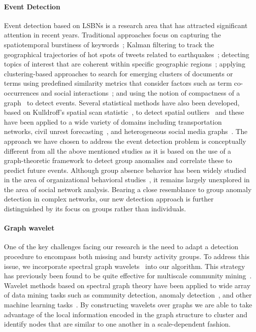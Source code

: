 \paragraph{Event Detection}
Event detection based on LSBNs is a research area that has attracted significant attention in recent years. Traditional approaches focus on capturing the spatiotemporal burstiness of keywords~\cite{lappas2009burstiness,lappas2012spatiotemporal}; Kalman filtering to track the geographical trajectories of hot spots of tweets related to earthquakes~\cite{sakaki2010earthquake}; detecting topics of interest that are coherent within specific geographic regions~\cite{eisenstein2010latent,hong2012discovering,yin2011geographical}; applying clustering-based approaches to search for emerging clusters of documents or terms using predefined similarity metrics that consider factors such as term co-occurrences and social interactions~\cite{aggarwal2012event,sayyadi2009event,watanabe2011jasmine,weng2011event}; and using the notion of compactness of a graph~\cite{rozenshtein2014event} to detect events. Several statistical methods have also been developed, based on Kulldroff's spatial scan statistic~\cite{kulldorff1997spatial}, to detect spatial outliers~\cite{chen2008detecting} and these have been applied to a wide variety of domains including transportation networks, civil unrest forecasting~\cite{zhao2014unsupervised}, and heterogeneous social media graphs~\cite{chen2014non}. The approach we have chosen to address the event detection problem is conceptually different from all the above mentioned studies as it is based on the use of a graph-theoretic framework to detect group anomalies and correlate these to predict future events. Although group absence behavior has been widely studied in the area of organizational behavioral studies~\cite{gaudine2001effects,seamonds1982stress}, it remains largely unexplored in the area of social network analysis.
Bearing a close resemblance to group anomaly detection in complex networks, our new detection approach is further distinguished by its focus on groups rather than individuals.


\paragraph{Graph wavelet}
One of the key challenges facing our research is the need to adapt a detection procedure to encompass both missing and bursty activity groups. To address this issue, we incorporate spectral graph wavelets~\cite{hammond2011wavelets} into our algorithm. This strategy has previously been found to be quite effective for multiscale community mining~\cite{tremblay2014graph}.
Wavelet methods based on spectral graph theory have been applied to wide array of data mining tasks such as community detection, anomaly detection~\cite{calderara2011detecting}, and other machine learning tasks~\cite{shuman_ACHA_2013,ghosh2003wavelet,rustamov2013wavelets,2000wavecluster}. By constructing wavelets over graphs we are able to take advantage of the local information encoded in the graph structure to cluster and identify nodes that are similar to one another in a scale-dependent fashion.

